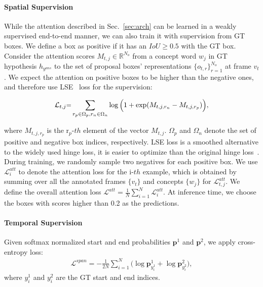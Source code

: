 \documentclass[11pt,a4paper]{article}
\begin{document}
\paragraph{Spatial Supervision} 
While the attention described in Sec.~\ref{sec:arch} can be learned in a weakly supervised end-to-end manner, we can also train it with supervision from GT boxes.
We define a box as positive if it has an $\mathit{IoU} \geq 0.5$ with the GT box. 
Consider the attention scores $M_{t, j} \in \mathbb{R}^{N_o}$ from a concept word $w_j$ in GT hypothesis $h_{y^\mathit{ans}}$ to the set of proposal boxes' representations $\{o_{t, r}\}_{r=1}^{N_o}$ at frame $v_t$. 
We expect the attention on positive boxes to be higher than the negative ones, and therefore use LSE~\cite{Li2017ImprovingPR} loss for the supervision:

\begin{align*}
    \small{\mathcal{L}_{t, j}} \mbox{=} \sum_{r_p \in \Omega_{p}, r_n \in \Omega_{n}}\log \Big(1 + \exp(M_{t,j,r_n} - M_{t,j,r_p})\Big),
\end{align*}

\noindent where $M_{t,j,r_p}$ is the $\text{r}_p\mbox{-}th$ element of the vector $M_{t, j}$. $\Omega_{p}$ and $\Omega_{n}$ denote the set of positive and negative box indices, respectively. LSE loss is a smoothed alternative to the widely used hinge loss, it is easier to optimize than the original hinge loss~\cite{Li2017ImprovingPR}.
During training, we randomly sample two negatives for each positive box. 
We use $\mathcal{L}^{att}_i$ to denote the attention loss for the $\text{i}\mbox{-}th$ example, which is obtained by summing over all the annotated frames $\{v_t\}$ and concepts $\{w_j\}$ for $\mathcal{L}^{att}_{t,j}$. 
We define the overall attention loss $\mathcal{L}^{att} = \frac{1}{N} \sum_{i=1}^{N} \mathcal{L}^{att}_i$.
At inference time, we choose the boxes with scores higher than 0.2 as the predictions.


\paragraph{Temporal Supervision} 
Given softmax normalized start and end probabilities $\mathbf{p}^{1}$ and $\mathbf{p}^{2}$, we apply cross-entropy loss:
\begin{align*}
    \mathcal{L}^\mathit{span} = - \frac{1}{2N} \sum_{i=1}^{N}\big(\log \mathbf{p}^1_{y_i^1} + \log \mathbf{p}^2_{y_i^2} \big),
\end{align*}
\noindent where $y_i^1$ and $y_i^2$ are the GT start and end indices. 
\end{document}
